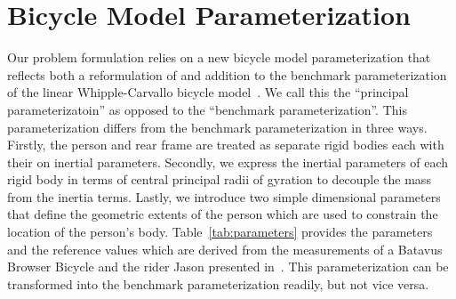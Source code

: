 \documentclass{bmd2019a}
\begin{document}
\section{Bicycle Model Parameterization}
%
Our problem formulation relies on a new bicycle model parameterization that
reflects both a reformulation of and addition to the benchmark parameterization
of the linear Whipple-Carvallo bicycle model~\cite{Meijaard2007}. We call this
the ``principal parameterizatoin'' as opposed to the ``benchmark
parameterization''. This parameterization differs from the benchmark
parameterization in three ways.  Firstly, the person and rear frame are treated
as separate rigid bodies each with their on inertial parameters. Secondly, we
express the inertial parameters of each rigid body in terms of central
principal radii of gyration to decouple the mass from the inertia terms.
Lastly, we introduce two simple dimensional parameters that define the
geometric extents of the person which are used to constrain the location of the
person's body. Table~\ref{tab:parameters} provides the parameters and the
reference values which are derived from the measurements of a Batavus Browser
Bicycle and the rider Jason presented in~\cite{Moore2012}. This
parameterization can be transformed into the benchmark parameterization
readily, but not vice versa.
%
\end{document}
